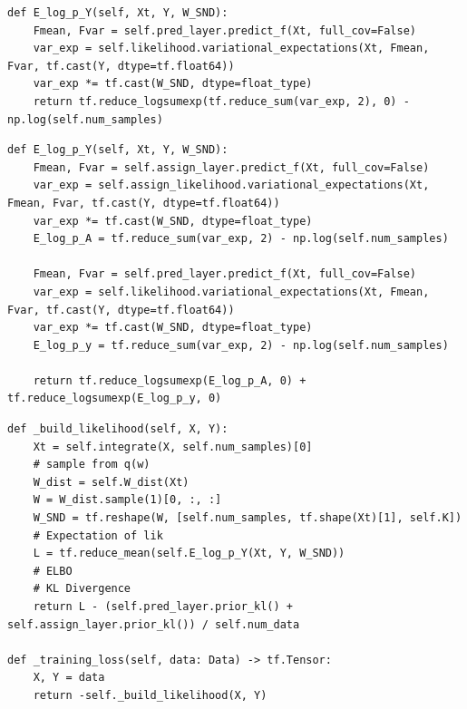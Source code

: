 \documentclass[12pt,a4paper]{report}
\theoremstyle{definition}
\begin{document}
\begin{lstlisting}[label=code:SMGPElogpY,  caption={E\_log\_p\_Y for the original SMGP using \citet{Lui2021} lowerbound}]
def E_log_p_Y(self, Xt, Y, W_SND):
    Fmean, Fvar = self.pred_layer.predict_f(Xt, full_cov=False)
    var_exp = self.likelihood.variational_expectations(Xt, Fmean, Fvar, tf.cast(Y, dtype=tf.float64))
    var_exp *= tf.cast(W_SND, dtype=float_type)
    return tf.reduce_logsumexp(tf.reduce_sum(var_exp, 2), 0) - np.log(self.num_samples)
\end{lstlisting}

\begin{lstlisting}[label=code:SMGPModifiedElogpY,  caption={E\_log\_p\_Y for the modified SMGP using \citet{Kaiser2020} lowerbound}]
def E_log_p_Y(self, Xt, Y, W_SND):
    Fmean, Fvar = self.assign_layer.predict_f(Xt, full_cov=False)
    var_exp = self.assign_likelihood.variational_expectations(Xt, Fmean, Fvar, tf.cast(Y, dtype=tf.float64))
    var_exp *= tf.cast(W_SND, dtype=float_type)
    E_log_p_A = tf.reduce_sum(var_exp, 2) - np.log(self.num_samples)

    Fmean, Fvar = self.pred_layer.predict_f(Xt, full_cov=False)
    var_exp = self.likelihood.variational_expectations(Xt, Fmean, Fvar, tf.cast(Y, dtype=tf.float64))
    var_exp *= tf.cast(W_SND, dtype=float_type)
    E_log_p_y = tf.reduce_sum(var_exp, 2) - np.log(self.num_samples)

    return tf.reduce_logsumexp(E_log_p_A, 0) + tf.reduce_logsumexp(E_log_p_y, 0)
\end{lstlisting}

\begin{lstlisting}[label=code:SMGPLikelihood,  caption={Likelihood for the modified SMGP}]
def _build_likelihood(self, X, Y):
    Xt = self.integrate(X, self.num_samples)[0]
    # sample from q(w)
    W_dist = self.W_dist(Xt)
    W = W_dist.sample(1)[0, :, :]
    W_SND = tf.reshape(W, [self.num_samples, tf.shape(Xt)[1], self.K])
    # Expectation of lik
    L = tf.reduce_mean(self.E_log_p_Y(Xt, Y, W_SND))
    # ELBO
    # KL Divergence
    return L - (self.pred_layer.prior_kl() + self.assign_layer.prior_kl()) / self.num_data

def _training_loss(self, data: Data) -> tf.Tensor:
    X, Y = data
    return -self._build_likelihood(X, Y)
\end{lstlisting}
\end{document}
